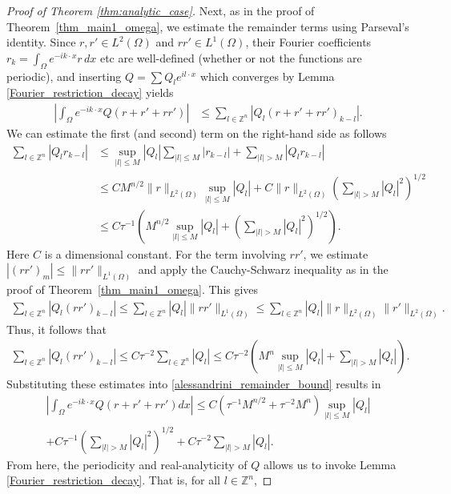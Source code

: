 \documentclass[a4paper, 11pt, twoside, notitlepage]{amsart}
\theoremstyle{definition}
\theoremstyle{remark}
\begin{document}
\begin{proof}[Proof of Theorem \ref{thm:analytic_case}]
Next, as in the proof of Theorem~\ref{thm_main1_omega}, we estimate the remainder terms using Parseval's identity. Since $r, r' \in L^2(\Omega)$ and $rr'\in L^1(\Omega)$, their Fourier coefficients $r_k = \int_{\Omega} e^{-ik \cdot x} r \,dx$ etc are well-defined (whether or not the functions are periodic), and inserting $Q = \sum Q_l e^{il \cdot x}$ which converges by Lemma \ref{Fourier_restriction_decay} yields 
\begin{align}\label{alessandrini_remainder_bound}
\left|\int_\Omega e^{-ik\cdot x}Q(r+r'+rr')\right|&\leq \sum_{l\in \mathbb{Z}^n} |Q_l(r+r'+rr')_{k-l}|.
\end{align}
We can estimate the first (and second) term on the right-hand side as follows
\begin{align*}
\sum_{l\in \mathbb{Z}^n} |Q_lr_{k-l}|&\leq \sup_{|l|\leq M}|Q_l| \sum_{|l|\leq M} |r_{k-l}|+\sum_{|l|>M}|Q_lr_{k-l}|\\ 
&\leq CM^{n/2} \|r\|_{L^2(\Omega)}\sup_{|l|\leq M}|Q_l|+ C\|r\|_{L^2(\Omega)}\left(\sum_{|l|>M}|Q_l|^2\right)^{1/2}\\ 
&\leq C\tau^{-1}\left(M^{n/2}\sup_{|l|\leq M}|Q_l|+\left(\sum_{|l|>M}|Q_l|^2\right)^{1/2}\right).
\end{align*}
Here $C$ is a dimensional constant. For the term involving $rr'$, we estimate $|(rr')_m| \leq \|rr'\|_{L^1(\Omega)}$ and apply the Cauchy-Schwarz inequality as in the proof of Theorem~\ref{thm_main1_omega}. This gives
\begin{align*}
    \sum_{l\in \mathbb{Z}^n} |Q_l(rr')_{k-l}|\leq \sum_{l\in \mathbb{Z}^n}|Q_l|\|rr'\|_{L^1(\Omega)}\leq
 \sum_{l\in \mathbb{Z}^n}|Q_l| \|r\|_{L^2(\Omega)}\|r'\|_{L^2(\Omega)}.
\end{align*}
Thus, it follows that 
\begin{align*}
    \sum_{l\in \mathbb{Z}^n} |Q_l(rr')_{k-l}| \leq C\tau^{-2} \sum_{l\in \mathbb{Z}^n}|Q_l|\leq C\tau^{-2}\left(M^n\sup_{|l|\leq M}|Q_l|+\sum_{|l|>M}|Q_l|\right).
\end{align*}
Substituting these estimates into \eqref{alessandrini_remainder_bound} results in 
\begin{multline*}
        \left|\int_\Omega e^{-ik\cdot x}Q(r+r'+rr')dx\right| \leq C(\tau^{-1}M^{n/2}+\tau^{-2}M^n)\sup_{|l|\leq M}|Q_l|\\+C\tau^{-1}\left(\sum_{|l|>M}|Q_l|^2\right)^{1/2}+C\tau^{-2}\sum_{|l|>M}|Q_l|. 
\end{multline*}
From here, the periodicity and real-analyticity of $Q$ allows us to invoke Lemma \ref{Fourier_restriction_decay}. That is, for all $l\in \mathbb{Z}^n$, 

\end{proof}
\end{document}
